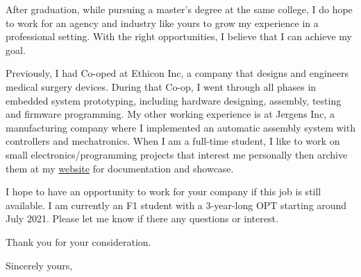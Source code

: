 \documentclass[11pt]{letter} %
\begin{document}
\begin{letter}
After graduation, while pursuing a master’s degree at the same college, I do hope to work for an agency and industry like yours to grow my experience in a professional setting. With the right opportunities, I believe that I can achieve my goal.

Previously, I had Co-oped at Ethicon Inc, a company that designs and engineers medical surgery devices. During that Co-op, I went through all phases in embedded system prototyping, including hardware designing, assembly, testing and firmware programming. My other working experience is at Jergens Inc, a manufacturing company where I implemented an automatic assembly system with controllers and mechatronics. When I am a full-time student, I like to work on small electronics/programming projects that interest me personally then archive them at my \href{https://liu2z2.github.io/}{website} for documentation and showcase. 

I hope to have an opportunity to work for your company if this job is still available. I am currently an F1 student with a 3-year-long OPT starting around July 2021. Please let me know if there any questions or interest. 

Thank you for your consideration.

\closing{Sincerely yours,}




\end{letter}
\end{document}
